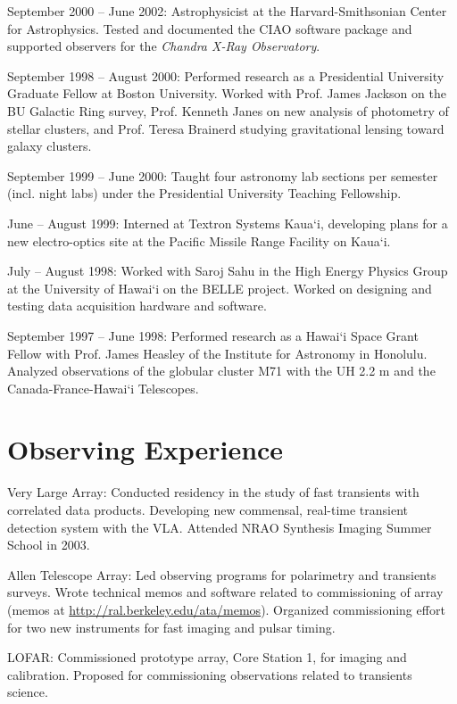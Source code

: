 \documentclass[12pt]{article}
\begin{document}
September 2000 -- June 2002:  Astrophysicist at the Harvard-Smithsonian Center for Astrophysics.  Tested and documented the CIAO software package and supported observers for the \emph{Chandra X-Ray Observatory}.

September 1998 -- August 2000:  Performed research as a Presidential University Graduate Fellow at Boston University.  Worked with Prof. James Jackson on the BU Galactic Ring survey, Prof. Kenneth Janes on new analysis of photometry of stellar clusters, and Prof. Teresa Brainerd studying gravitational lensing toward galaxy clusters.

September 1999 -- June 2000:  Taught four astronomy lab sections per semester (incl. night labs) under the Presidential University Teaching Fellowship.

June -- August 1999:  Interned at Textron Systems Kaua`i, developing plans for a new electro-optics site at the Pacific Missile Range Facility on Kaua`i.

July -- August 1998:  Worked with Saroj Sahu in the High Energy Physics Group at the University of Hawai`i on the BELLE project.  Worked on designing and testing data acquisition hardware and software.

September 1997 -- June 1998:  Performed research as a Hawai`i Space Grant Fellow with Prof. James Heasley of the Institute for Astronomy in Honolulu.  Analyzed observations of the globular cluster M71 with the UH 2.2 m and the Canada-France-Hawai`i Telescopes.

\section{Observing Experience}
\indent

Very Large Array: Conducted residency in the study of fast transients with correlated data products. Developing new commensal, real-time transient detection system with the VLA. Attended NRAO Synthesis Imaging Summer School in 2003.

Allen Telescope Array: Led observing programs for polarimetry and transients surveys.  Wrote technical memos and software related to commissioning of array (memos at \url{http://ral.berkeley.edu/ata/memos}).  Organized commissioning effort for two new instruments for fast imaging and pulsar timing.

LOFAR: Commissioned prototype array, Core Station 1, for imaging and calibration.  Proposed for commissioning observations related to transients science.
\end{document}
